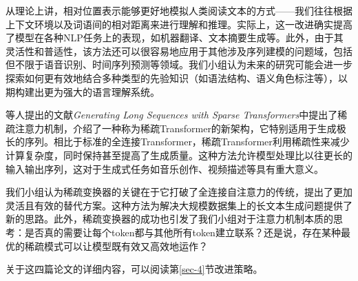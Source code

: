 从理论上讲，相对位置表示能够更好地模拟人类阅读文本的方式——我们往往根据上下文环境以及词语间的相对距离来进行理解和推理。实际上，这一改进确实提高了模型在各种NLP任务上的表现，如机器翻译、文本摘要生成等。此外，由于其灵活性和普适性，该方法还可以很容易地应用于其他涉及序列建模的问题域，包括但不限于语音识别、时间序列预测等领域。我们小组认为未来的研究可能会进一步探索如何更有效地结合多种类型的先验知识（如语法结构、语义角色标注等），以期构建出更为强大的语言理解系统。
	
\citeauthor{childGeneratingLongSequences2019}等人提出的文献\textit{Generating Long Sequences with Sparse Transformers}中提出了稀疏注意力机制，介绍了一种称为稀疏Transformer的新架构，它特别适用于生成极长的序列。相比于标准的全连接Transformer，稀疏Transformer利用稀疏性来减少计算复杂度，同时保持甚至提高了生成质量。这种方法允许模型处理比以往更长的输入输出序列，这对于生成式任务如音乐创作、视频描述等具有重大意义。
	
我们小组认为稀疏变换器的关键在于它打破了全连接自注意力的传统，提出了更加灵活且有效的替代方案。这种方法为解决大规模数据集上的长文本生成问题提供了新的思路。此外，稀疏变换器的成功也引发了我们小组对于注意力机制本质的思考：是否真的需要让每个token都与其他所有token建立联系？还是说，存在某种最优的稀疏模式可以让模型既有效又高效地运作？

关于这四篇论文的详细内容，可以阅读第\ref{sec-4}节改进策略。